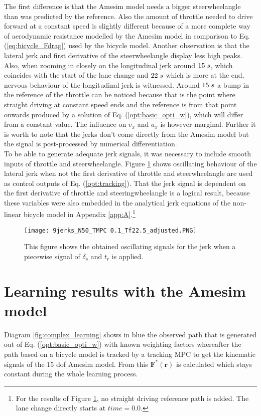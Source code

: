 The first difference is that the Amesim model needs a bigger steerwheelangle than was predicted by the reference. Also the amount of throttle needed to drive forward at a constant speed is slightly different because of a more complete way of aerodynamic resistance modelled by the Amesim model in comparison to Eq. (\ref{eq:bicycle_Fdrag}) used by the bicycle model.
Another observation is that the lateral jerk and first derivative of the steerwheelangle display less high peaks. Also, when zooming in closely on the longitudinal jerk around $15\hspace{1mm}s$, which coincides with the start of the lane change and $22\hspace{1mm}s$ which is more at the end, nervous behaviour of the longitudinal jerk is witnessed. Around $15\hspace{1mm}s$ a bump in the reference of the throttle can be noticed because that is the point where straight driving at constant speed ends and the reference is from that point onwards produced by a solution of Eq. (\ref{opt:basic_opti_w}), which will differ from a constant value. The influence on $v_x$ and $a_x$ is however marginal. Further it is worth to note that the jerks don't come directly from the Amesim model but the signal is post-processed by numerical differentiation. \\

To be able to generate adequate jerk signals, it was necessary to include smooth inputs of throttle and steerwheelangle. Figure \ref{fig:old_inputs} shows oscillating behaviour of the lateral jerk when not the first derivative of throttle and steerwheelangle are used as control outputs of Eq. (\ref{opt:tracking}). That the jerk signal is dependent on the first derivative of throttle and steeringwheelangle is a logical result, because these variables were also embedded in the analytical jerk equations of the non-linear bicycle model in Appendix \ref{app:A}.\footnote{For the results of Figure \ref{fig:old_inputs}, no straight driving reference path is added. The lane change directly starts at $time = 0.0$.}

\begin{figure}[h!]
	\centering
	\texttt{[image: 9jerks\_N50\_TMPC 0.1\_Tf22.5\_adjusted.PNG]}
	\caption{This figure shows the obtained oscillating signals for the jerk when a piecewise signal of $\delta_s$ and $t_r$ is applied.}	
	\label{fig:old_inputs}
\end{figure}
\newpage
\section{Learning results with the Amesim model}
\label{s:complex_learning_results}
Diagram \ref{fig:complex_learning} shows in blue the observed path that is generated out of Eq. (\ref{opt:basic_opti_w}) with known weighting factors whereafter the path based on a bicycle model is tracked by a tracking MPC to get the kinematic signals of the $15$ dof Amesim model. From this $\bm{F}^*(\bm{r})$ is calculated which stays constant during the whole learning process.\\

